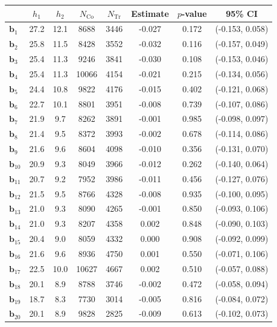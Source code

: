 \documentclass[10pt]{article}
\newcommand{\bb}{\mathbf{b}}
\begin{document}
\begin{table}[p]
    \centering
\begin{tabular}{lccccccc}
  \toprule\toprule
   & $h_1$ & $h_2$ & $N_{\mathrm{Co}}$ & $N_{\mathrm{Tr}}$ & Estimate & $p$-value & 95\% CI \\
  \midrule
   $\bb_{1}$ & 27.2 & 12.1 & 8688 & 3446 & -0.027 & 0.172 & (-0.153, 0.058)\\
   $\bb_{2}$ & 25.8 & 11.5 & 8428 & 3552 & -0.032 & 0.116 & (-0.157, 0.049)\\
   $\bb_{3}$ & 25.4 & 11.3 & 9246 & 3841 & -0.030 & 0.108 & (-0.153, 0.046)\\
   $\bb_{4}$ & 25.4 & 11.3 & 10066 & 4154 & -0.021 & 0.215 & (-0.134, 0.056)\\
   $\bb_{5}$ & 24.4 & 10.8 & 9822 & 4176 & -0.015 & 0.402 & (-0.121, 0.068)\\
   $\bb_{6}$ & 22.7 & 10.1 & 8801 & 3951 & -0.008 & 0.739 & (-0.107, 0.086)\\
   $\bb_{7}$ & 21.9 & 9.7 & 8262 & 3891 & -0.001 & 0.985 & (-0.098, 0.097)\\
   $\bb_{8}$ & 21.4 & 9.5 & 8372 & 3993 & -0.002 & 0.678 & (-0.114, 0.086)\\
   $\bb_{9}$ & 21.6 & 9.6 & 8604 & 4098 & -0.010 & 0.356 & (-0.131, 0.070)\\
   $\bb_{10}$ & 20.9 & 9.3 & 8049 & 3966 & -0.012 & 0.262 & (-0.140, 0.064)\\
   $\bb_{11}$ & 20.7 & 9.2 & 7952 & 3986 & -0.011 & 0.456 & (-0.127, 0.076)\\
   $\bb_{12}$ & 21.5 & 9.5 & 8766 & 4328 & -0.008 & 0.935 & (-0.100, 0.095)\\
   $\bb_{13}$ & 21.0 & 9.3 & 8090 & 4265 & -0.001 & 0.850 & (-0.093, 0.106)\\
   $\bb_{14}$ & 21.0 & 9.3 & 8207 & 4358 & 0.002 & 0.848 & (-0.090, 0.103)\\
   $\bb_{15}$ & 20.4 & 9.0 & 8059 & 4332 & 0.000 & 0.908 & (-0.092, 0.099)\\
   $\bb_{16}$ & 21.6 & 9.6 & 8936 & 4750 & 0.001 & 0.550 & (-0.071, 0.106)\\
   $\bb_{17}$ & 22.5 & 10.0 & 10627 & 4667 & 0.002 & 0.510 & (-0.057, 0.088)\\
   $\bb_{18}$ & 20.1 & 8.9 & 8788 & 3746 & -0.002 & 0.472 & (-0.058, 0.094)\\
   $\bb_{19}$ & 18.7 & 8.3 & 7730 & 3014 & -0.005 & 0.816 & (-0.084, 0.072)\\
   $\bb_{20}$ & 20.1 & 8.9 & 9828 & 2825 & -0.009 & 0.613 & (-0.102, 0.073)\\

\end{tabular}
\end{table}
\end{document}
